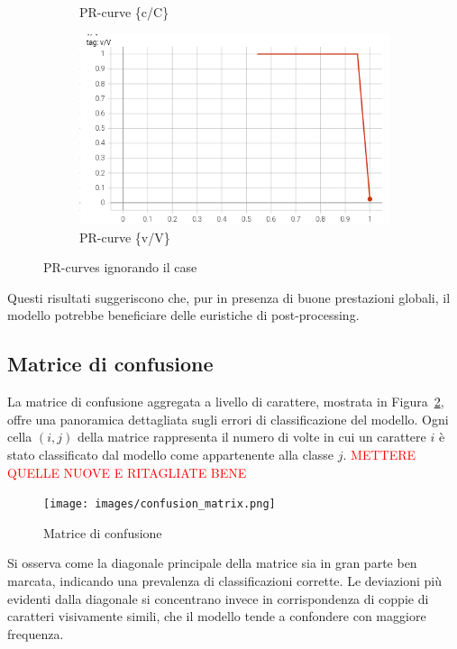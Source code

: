 \begin{figure}[htbp]
\begin{subfigure}[t]{0.32\textwidth}
        \caption{PR-curve \{c/C\}}
    \end{subfigure}
    \begin{subfigure}[t]{0.32\textwidth}
        \centering
        \includegraphics[width=\textwidth]{images/pr_ignore3.png}
        \caption{PR-curve \{v/V\}}
    \end{subfigure}
    \caption{PR-curves ignorando il case}
    \label{fig:pr-ignore}
\end{figure}

Questi risultati suggeriscono che, pur in presenza di buone prestazioni globali, il modello potrebbe beneficiare delle euristiche di post-processing.


\subsection{Matrice di confusione}
La matrice di confusione aggregata a livello di carattere, mostrata in Figura~\ref{fig:confusion_matrix}, offre una panoramica dettagliata sugli errori di classificazione del modello. Ogni cella \((i, j)\) della matrice rappresenta il numero di volte in cui un carattere \(i\) è stato classificato dal modello come appartenente alla classe \(j\).
\textcolor{red}{METTERE QUELLE NUOVE E RITAGLIATE BENE}
\begin{figure}[htbp]
    \centering
    \texttt{[image: images/confusion\_matrix.png]}
    \caption{Matrice di confusione}
    \label{fig:confusion_matrix}
\end{figure}

Si osserva come la diagonale principale della matrice sia in gran parte ben marcata, indicando una prevalenza di classificazioni corrette. Le deviazioni più evidenti dalla diagonale si concentrano invece in corrispondenza di coppie di caratteri visivamente simili, che il modello tende a confondere con maggiore frequenza.

